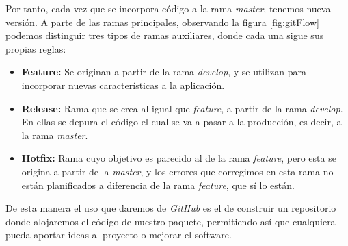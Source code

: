 Por tanto, cada vez que se incorpora código a la rama \textit{master}, tenemos nueva versión. A parte de las ramas principales, observando la figura \ref{fig:gitFlow} podemos distinguir tres tipos de ramas auxiliares, donde cada una sigue sus propias reglas:
\begin{itemize}
    \item \textbf{Feature:} Se originan a partir de la rama \textit{develop}, y  se utilizan para incorporar nuevas características a la aplicación.
    \item \textbf{Release:} Rama que se crea al igual que \textit{feature}, a partir de la rama \textit{develop}. En ellas se depura el código el cual se va a pasar a la producción, es decir, a la rama \textit{master}.
    \item \textbf{Hotfix:} Rama cuyo objetivo es parecido al de la rama \textit{feature}, pero esta se origina a partir de la \emph{master}, y los errores que corregimos en esta rama no están planificados a diferencia de la rama \emph{feature}, que sí lo están.
\end{itemize}
De esta manera el uso que daremos de \emph{GitHub} es el de construir un repositorio donde alojaremos el código de nuestro paquete, permitiendo así que cualquiera pueda aportar ideas al proyecto o mejorar el software.

